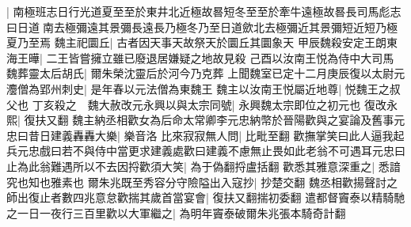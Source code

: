 |{
	南極班志日行光道夏至至於東井北近極故晷短冬至至於牽牛遠極故晷長司馬彪志曰日道南去極彌遠其景彌長遠長乃極冬乃至日道歛北去極彌近其景彌短近短乃極夏乃至焉}
魏主祀圜丘|{
	古者因天事天故祭天於圜丘其圜象天}
甲辰魏殺安定王朗東海王曄|{
	二王皆嘗擁立雖已廢退居嫌疑之地故見殺}
己酉以汝南王悦為侍中大司馬　魏葬靈太后胡氏|{
	爾朱榮沈靈后於河今乃克葬}
上聞魏室已定十二月庚辰復以太尉元灋僧為郢州刺史|{
	是年春以元法僧為東魏王}
魏主以汝南王悦屬近地尊|{
	悦魏王之叔父也}
丁亥殺之　魏大赦改元永興以與太宗同號|{
	永興魏太宗即位之初元也}
復改永熙|{
	復扶又翻}
魏主納丞相歡女為后命太常卿李元忠納幣於晉陽歡與之宴論及舊事元忠曰昔日建義轟轟大樂|{
	樂音洛}
比來寂寂無人問|{
	比毗至翻}
歡撫掌笑曰此人逼我起兵元忠戲曰若不與侍中當更求建義處歡曰建義不慮無止畏如此老翁不可遇耳元忠曰止為此翁難遇所以不去因捋歡須大笑|{
	為于偽翻捋盧括翻}
歡悉其雅意深重之|{
	悉諳究也知也雅素也}
爾朱兆既至秀容分守險隘出入寇抄|{
	抄楚交翻}
魏丞相歡揚聲討之師出復止者數四兆意怠歡揣其歲首當宴會|{
	復扶又翻揣初委翻}
遣都督竇泰以精騎馳之一日一夜行三百里歡以大軍繼之|{
	為明年竇泰破爾朱兆張本騎奇計翻}


